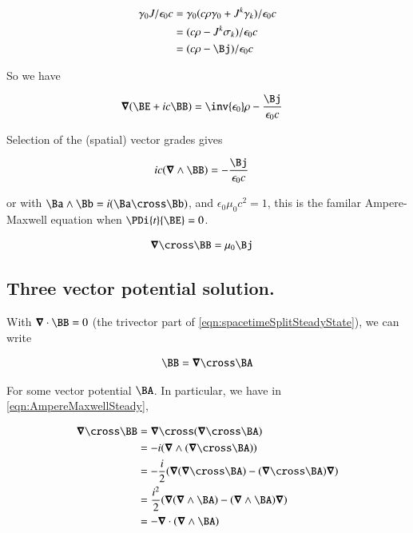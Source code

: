 \documentclass{article}
\begin{document}
\begin{align*}
\gamma_0 J/\epsilon_0 c
&=
\gamma_0 (c \rho \gamma_0 + J^k \gamma_k)/\epsilon_0 c  \\
&=
(c \rho - J^k \sigma_k)/\epsilon_0 c  \\
&=
(c \rho - \Bj)/\epsilon_0 c  \\
\end{align*}

So we have

\begin{align}\label{eqn:spacetimeSplitSteadyState}
\spacegrad (\BE + i c \BB)
&=
\inv{\epsilon_0}\rho - \frac{\Bj}{\epsilon_0 c}
\end{align}

Selection of the (spatial) vector grades gives

\begin{align*}
i c (\spacegrad \wedge \BB) &= - \frac{\Bj}{\epsilon_0 c}
\end{align*}

or with $\Ba \wedge \Bb = i (\Ba \cross \Bb)$, and $\epsilon_0 \mu_0 c^2 = 1$, this is the familar Ampere-Maxwell equation when $\PDi{t}{\BE} = 0$.

\begin{align}\label{eqn:AmpereMaxwellSteady}
\spacegrad \cross \BB &= \mu_0 \Bj
\end{align}

\subsection{ Three vector potential solution. }

With $\spacegrad \cdot \BB = 0$ (the trivector part of \ref{eqn:spacetimeSplitSteadyState}), we can write

\begin{align*}
\BB = \spacegrad \cross \BA
\end{align*}

For some vector potential $\BA$.  In particular, we have in \ref{eqn:AmpereMaxwellSteady},

\begin{align*}
\spacegrad \cross \BB
&=
\spacegrad \cross (\spacegrad \cross \BA) \\
&=
-i (\spacegrad \wedge (\spacegrad \cross \BA) ) \\
&=
-\frac{i}{2} (
\spacegrad (\spacegrad \cross \BA)
- (\spacegrad \cross \BA) \spacegrad
) \\
&=
\frac{i^2}{2} (
\spacegrad (\spacegrad \wedge \BA)
- (\spacegrad \wedge \BA) \spacegrad
) \\
&=
- \spacegrad \cdot (\spacegrad \wedge \BA)
\\
\end{align*}
\end{document}
